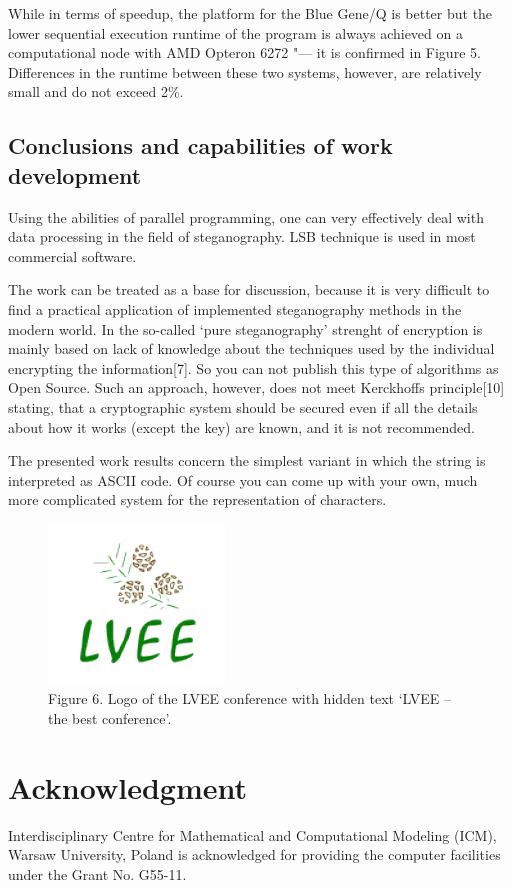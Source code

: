 \documentclass[10pt, a5paper]{article}
\begin{document}
While in terms of speedup, the platform for the Blue Gene/Q is better but the lower sequential execution runtime of the program is always achieved on a computational node with AMD Opteron 6272 "--- it is confirmed in Figure 5. Differences in the runtime between these two systems, however, are relatively small and do not exceed 2\%.

\subsection*{Conclusions and capabilities of work development}

Using the abilities of parallel programming, one  can very effectively deal with data processing in the field of steganography. LSB technique is used in most commercial software.

The work can be treated as a base for discussion, because it is very difficult to find a practical application of implemented steganography methods in the modern world. In the so-called ‘pure steganography’ strenght of encryption is mainly based on lack of knowledge about the techniques used by the individual encrypting the information[7]. So you can not publish this type of algorithms as Open Source. Such an approach, however, does not meet Kerckhoffs principle[10] stating, that a cryptographic system should be secured even if all the details about how it works (except the key) are known, and it is not recommended.

The presented work results concern the simplest variant in which the string is interpreted as ASCII code. Of course you can come up with your own, much more complicated system for the representation of characters.

\begin{figure}[h!]
  \centering
    \includegraphics[scale=0.8]{103_2014_w_Kwiatkowska_lvee.png}\\
Figure 6. Logo of the LVEE conference with hidden text ‘LVEE – the best conference’.
\end{figure}

\section*{Acknowledgment}
Interdisciplinary Centre for Mathematical and Computational Modeling (ICM), Warsaw University, Poland is acknowledged for providing the computer facilities under the Grant No. G55-11.
\end{document}
